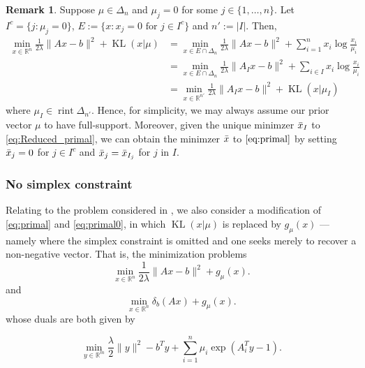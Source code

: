 \documentclass[10pt,a4paper]{article}
\numberwithin{equation}{section}
\theoremstyle{definition}
\newtheorem{remark}[theorem]{Remark}
\def\rr{{\mathbb R}}
\DeclareMathOperator{\rint}{rint}
\DeclareMathOperator{\KL}{KL}
\begin{document}
\begin{remark}
    Suppose $\mu \in \Delta_n$ and $\mu_j = 0$ for some $j \in \{1,\dots,n\}$. Let $I^c = \{j: \mu_j = 0\}$, $E := \{x: x_j = 0 \text{ for } j \in I^c \}$ and $n' := |I|$. Then, 
    \begin{align}
         \min_{x \in \rr^n} \frac{1}{2 \lambda} \lVert Ax - b \rVert^2 + \KL(x| \mu)&=  \min_{x \in E \cap \Delta_n} \frac{1}{2 \lambda} \lVert Ax - b \rVert^2 + \sum_{i=1}^n x_i \log\frac{x_i}{\mu_i}  \nonumber \\ 
          &=  \min_{x \in E \cap \Delta_n} \frac{1}{2 \lambda} \lVert A_Ix - b \rVert^2 + \sum_{i \in I} x_i \log\frac{x_i}{\mu_i} \nonumber \\ 
           &=  \min_{x \in \rr^{n'}} \frac{1}{2 \lambda} \lVert A_Ix - b \rVert^2 + \KL(x|\mu_I) \label{eq:Reduced_primal}
    \end{align}
    where $\mu_I \in \rint \Delta_{n'}$. Hence, for simplicity, we may always assume our prior vector $\mu$ to have full-support. Moreover, given the unique minimzer $\Bar{x}_I$ to \eqref{eq:Reduced_primal}, we can obtain the minimzer $\Bar{x}$ to $\eqref{eq:primal}$ by setting $\Bar{x}_j = 0$ for $j \in I^c$ and $\Bar{x}_j = \Bar{x}_{I_j}$ for $j$ in $I$. 
\end{remark}

\subsubsection{No simplex constraint}

Relating to the problem considered in \cite{eriksson_NoteSolutionLarge_1980}, we also consider a modification of \eqref{eq:primal} and \eqref{eq:primal0}, in which  $\KL(x| \mu)$ is replaced by $g_\mu(x)$ --- namely where the simplex constraint is omitted and one seeks merely to recover a non-negative vector. That is, the minimization problems
\begin{equation}\label{eq:primal_noSimplex}
      \min_{x \in \rr^n} \frac{1}{2 \lambda} \lVert Ax - b \rVert^2 +  g_\mu(x).
\end{equation}
and
\begin{equation}\label{eq:primal_noSimplex0}
   \min_{x \in \rr^n} \delta_{b}(Ax) + g_\mu(x).
\end{equation}
whose duals are both given by

\begin{equation}\label{eq:dual_noSimplex}
    \min_{y \in \rr^m} \frac{\lambda}{2} \lVert y \rVert^2 - b^Ty + \sum_{i=1}^n \mu_i \exp(A_i^T y - 1).
\end{equation}
\end{document}
